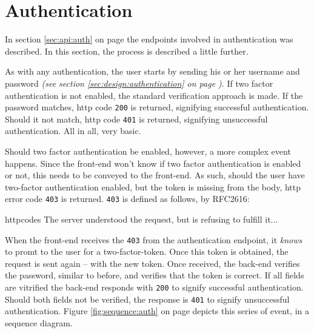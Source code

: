 	\section{Authentication}
		In section \ref{sec:api:auth} on page \pageref{sec:api:auth} the endpoints involved in authentication was described. In this section, the process is described a little further. 

		As with any authentication, the user starts by sending his or her username and password \emph{(see section \ref{sec:design:authentication} on page \pageref{sec:design:authentication})}. If two factor authentication is not enabled, the standard verification approach is made. If the password matches, http code \verb=200= is returned, signifying successful authentication. Should it not match, http code \verb=401= is returned, signifying unsuccessful authentication. All in all, very basic.

		Should two factor authentication be enabled, however, a more complex event happens. Since the front-end won't know if two factor authentication is enabled or not, this needs to be conveyed to the front-end. As such, should the user have two-factor authentication enabled, but the token is missing from the body, http error code \verb=403= is returned. \verb=403= is defined as follows, by RFC2616\cite{httpcodes}:
		\begin{citequote}[sec.10.4.4]{httpcodes}
			   The server understood the request, but is refusing to fulfill it...
		\end{citequote}
		When the front-end receives the \verb=403= from the authentication endpoint, it \emph{knows} to promt to the user for a two-factor-token. Once this token is obtained, the request is sent again -- with the new token. Once received, the back-end verifies the password, similar to before, and verifies that the token is correct. If all fields are vitrified the back-end responds with \verb=200= to signify successful authentication. Should both fields not be verified, the response is \verb=401= to signify unsuccessful authentication. Figure \ref{fig:sequence:auth} on page \pageref{fig:sequence:auth} depicts this series of event, in a sequence diagram.

